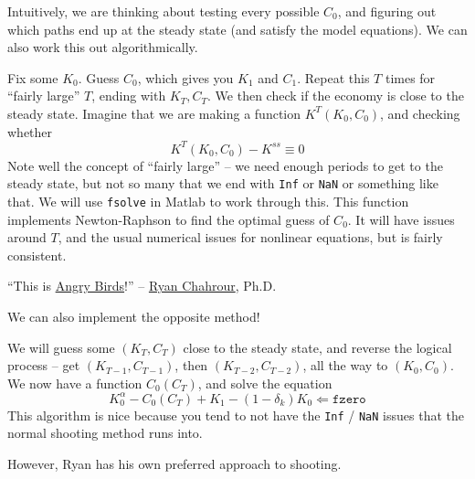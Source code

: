 \documentclass[10pt]{article}
\begin{document}
\begin{remark}
	Intuitively, we are thinking about testing every possible $C_0$, and figuring out which paths end up at the steady state (and satisfy the model equations). We can also work this out algorithmically.
\end{remark}

\begin{algorithm}
	 Fix some $K_0$. Guess $C_0$, which gives you $K_1$ and $C_1$. Repeat this $T$ times for ``fairly large'' $T$, ending with $K_T,C_T$. We then check if the economy is close to the steady state. Imagine that we are making a function $K^T(K_0,C_0)$, and checking whether
	\[
	K^T(K_0,C_0) - K^{ss} \equiv 0
	\]
	Note well the concept of ``fairly large'' -- we need enough periods to get to the steady state, but not so many that we end with \texttt{Inf} or \texttt{NaN} or something like that. We will use \texttt{fsolve} in Matlab to work through this. This function implements Newton-Raphson to find the optimal guess of $C_0$. It will have issues around $T$, and the usual numerical issues for nonlinear equations, but is fairly consistent.
\end{algorithm}

\begin{remark}
	``This is \href{https://www.angrybirds.com/}{Angry Birds}!'' -- \href{https://www.chahrour.net/}{Ryan Chahrour}, Ph.D.
\end{remark}

We can also implement the opposite method!

\begin{algorithm}
	 We will guess some $(K_T,C_T)$ close to the steady state, and reverse the logical process -- get $(K_{T-1},C_{T-1})$, then $(K_{T-2},C_{T-2})$, all the way to $(K_0,C_0)$. We now have a function $C_0(C_T)$, and solve the equation
	\[
	K_0^\alpha - C_0(C_T) + K_1 - (1-\delta_k)K_0 \Longleftarrow \texttt{fzero}
	\]
	This algorithm is nice because you tend to not have the \texttt{Inf} / \texttt{NaN} issues that the normal shooting method runs into.
\end{algorithm}

However, Ryan has his own preferred approach to shooting.
\end{document}
